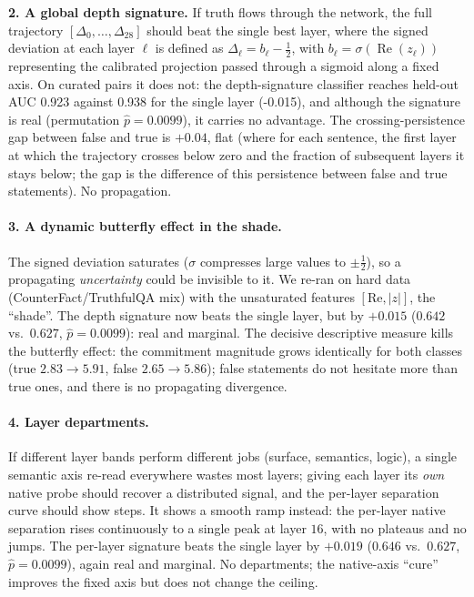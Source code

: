 \documentclass[11pt]{article}
\begin{document}
\textbf{2. A global depth signature.} If truth flows through the network, the full trajectory $[\Delta_0, \dots, \Delta_{28}]$ should beat the single best layer, where the signed deviation at each layer $\ell$ is defined as $\Delta_\ell = b_\ell - \frac{1}{2}$, with $b_\ell = \sigma(\operatorname{Re}(z_\ell))$ representing the calibrated projection passed through a sigmoid along a fixed axis. On curated pairs it does not: the depth-signature classifier reaches held-out AUC 0.923 against 0.938 for the single layer (-0.015), and although the signature is real (permutation $\hat{p} = 0.0099$), it carries no advantage. The crossing-persistence gap between false and true is $+0.04$, flat (where for each sentence, the first layer at which the trajectory crosses below zero and the fraction of subsequent layers it stays below; the gap is the difference of this persistence between false and true statements). No propagation.


\paragraph{3. A dynamic butterfly effect in the shade.} The signed deviation
saturates ($\sigma$ compresses large values to $\pm\tfrac12$), so a
propagating \emph{uncertainty} could be invisible to it. We re-ran on hard
data (CounterFact/TruthfulQA mix) with the unsaturated features
$[\mathrm{Re}, |z|]$, the ``shade''. The depth signature now beats the single
layer, but by $+0.015$ ($0.642$ vs.\ $0.627$, $\hat{p} = 0.0099$): real and
marginal. The decisive descriptive measure kills the butterfly effect: the
commitment magnitude grows identically for both classes (true
$2.83 \to 5.91$, false $2.65 \to 5.86$); false statements do not hesitate
more than true ones, and there is no propagating divergence.

\paragraph{4. Layer departments.} If different layer bands perform different
jobs (surface, semantics, logic), a single semantic axis re-read everywhere
wastes most layers; giving each layer its \emph{own} native probe should
recover a distributed signal, and the per-layer separation curve should show
steps. It shows a smooth ramp instead: the per-layer native separation rises
continuously to a single peak at layer $16$, with no plateaus and no jumps.
The per-layer signature beats the single layer by $+0.019$ ($0.646$ vs.\
$0.627$, $\hat{p} = 0.0099$), again real and marginal. No departments; the
native-axis ``cure'' improves the fixed axis but does not change the ceiling.
\end{document}
